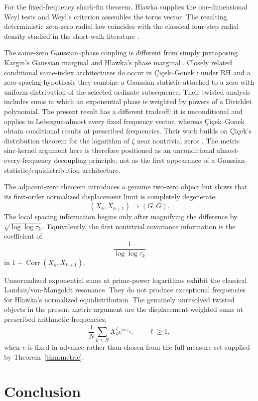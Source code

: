 \documentclass[pdflatex,sn-mathphys-num]{sn-jnl}
\numberwithin{equation}{section}
\theoremstyle{thmstyleone}
\theoremstyle{thmstylethree}
\theoremstyle{thmstyletwo}
\newcommand{\Corr}{\operatorname{Corr}}
\newcommand{\1}{\mathbf 1}
\begin{document}
For the fixed-frequency shark-fin theorem, Hlawka \cite{Hlawka1975} supplies
the one-dimensional Weyl tests and Weyl's criterion \cite{Weyl1916} assembles
the torus vector.  The resulting deterministic zeta-zero radial law coincides
with the classical four-step radial density studied in the short-walk literature
\cite{BorweinEtAl2012,BorweinStraubWan2013}.

The same-zero Gaussian--phase coupling is different from simply juxtaposing
Kargin's Gaussian marginal \cite{Kargin2013} and Hlawka's phase marginal
\cite{Hlawka1975}.  Closely related conditional same-index architectures do occur in
Çiçek--Gonek \cite{CicekGonek2024}: under RH and a zero-spacing hypothesis they combine
a Gaussian statistic attached to a zero with uniform distribution of the selected
ordinate subsequence.  Their twisted analysis includes sums in which an exponential
phase is weighted by powers of a Dirichlet polynomial.  The present result has a
different tradeoff: it is unconditional and applies to Lebesgue-almost every fixed
frequency vector, whereas Çiçek--Gonek obtain conditional results at prescribed
frequencies.  Their work builds on Çiçek's distribution theorem for the logarithm of
\(\zeta\) near nontrivial zeros \cite{Cicek2021}.  The metric sinc-kernel argument here
is therefore positioned as an unconditional almost-every-frequency decoupling
principle, not as the first appearance of a Gaussian-statistic/equidistribution
architecture.

The adjacent-zero theorem introduces a genuine two-zero object but shows that its first-order normalized displacement limit is completely degenerate:
\[
 (X_k,X_{k+1})\Rightarrow(G,G).
\]
The local spacing information begins only after magnifying the difference by $\sqrt{\log\log\tau_k}$.  Equivalently, the first nontrivial covariance information is the coefficient of
\[
 \frac1{\log\log\tau_k}
\]
in $1-\Corr(X_k,X_{k+1})$.

Unnormalized exponential sums at prime-power logarithms exhibit the classical Landau/von-Mangoldt resonance.  They do not produce exceptional frequencies for Hlawka's normalized equidistribution.  The genuinely unresolved twisted objects in the present metric argument are the displacement-weighted sums at prescribed arithmetic frequencies,
\[
 \frac1N\sum_{k\le N}X_k^\ell e^{iv\gamma_k},
 \qquad \ell\ge1,
\]
when $v$ is fixed in advance rather than chosen from the full-measure set supplied by Theorem~\ref{thm:metric}.

\section{Conclusion}
\end{document}
